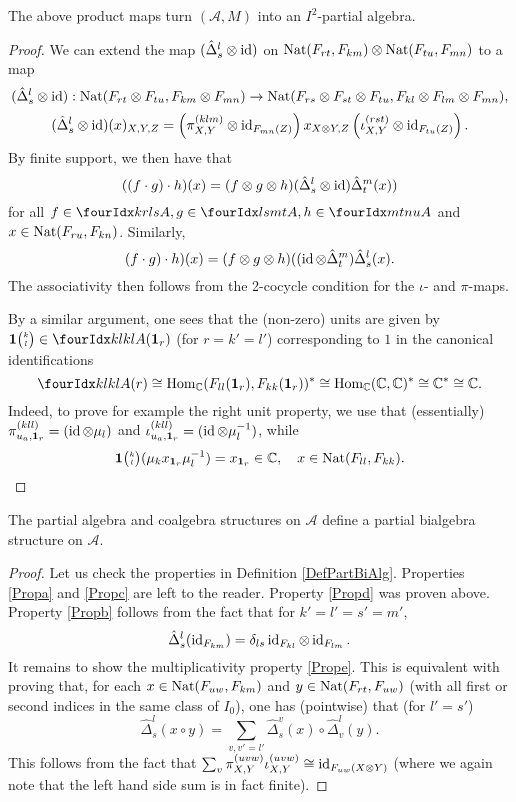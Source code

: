\begin{Lem} The above product maps turn $(\mathscr{A},M)$ into an $I^2$-partial algebra.
\end{Lem}
\begin{proof} We can extend the map $(\hat{\Delta}^l_s\otimes \operatorname{id})$ on $\operatorname{\mathrm{Nat}}(F_{rt},F_{km})\otimes \operatorname{\mathrm{Nat}}(F_{tu},F_{mn})$ to a map \[(\hat{\Delta}^l_s\otimes \operatorname{id}): \operatorname{\mathrm{Nat}}(F_{rt}\otimes F_{tu},F_{km}\otimes F_{mn}) \rightarrow  \operatorname{\mathrm{Nat}}(F_{rs}\otimes F_{st}\otimes F_{tu},F_{kl}\otimes F_{lm}\otimes F_{mn}),\] \[(\hat{\Delta}^l_s\otimes \operatorname{id})(x)_{X,Y,Z} = \left(\pi^{(klm)}_{X,Y}\otimes \operatorname{id}_{F_{mn}(Z)}\right) x_{X\otimes Y, Z} \left(\iota^{(rst)}_{X,Y} \otimes \operatorname{id}_{F_{tu}(Z)}\right).\]
By finite support, we then have that \[((f\cdot g)\cdot h)(x) = (f\otimes g\otimes h)(\hat{\Delta}^l_s\otimes \operatorname{id})\hat{\Delta}^m_t(x))\] for all $f\in \Gr{A}{k}{l}{r}{s},g\in \Gr{A}{l}{m}{s}{t},h\in \Gr{A}{m}{n}{t}{u}$ and $x\in  \operatorname{\mathrm{Nat}}(F_{ru},F_{kn})$. Similarly, \[(f\cdot g)\cdot h)(x) = (f\otimes g\otimes h)((\operatorname{id}\otimes \hat{\Delta}^m_t)\hat{\Delta}^l_s(x).\] The associativity then follows from the 2-cocycle condition for the $\iota$- and $\pi$-maps. 

By a similar argument, one sees that the (non-zero) units are given by $\UnitC{k}{l}\in \Gr{A}{k}{k}{l}{l}(\Unit_{r})$  (for $r=k'=l'$) corresponding to $1$ in the canonical identifications  \[\Gr{A}{k}{k}{l}{l}(r) \cong \Hom_{\C}(\Forget_{ll}(\Unit_{r}),\Forget_{kk}(\Unit_{r}))^*\cong \Hom_{\C}(\C,\C)^*  \cong \C^* \cong \C.\] Indeed, to prove for example the right unit property, we use that (essentially) $\pi_{u_a,\mathbf{1}_{r}}^{(kll)} =(\operatorname{id}\otimes \mu_l)$ and $\iota_{u_a,\mathbf{1}_{r}}^{(kll)} = (\operatorname{id}\otimes \mu_l^{-1})$, while \[\mathbf{1}{\tiny {\begin{pmatrix} k\\l\end{pmatrix}}}(\mu_kx_{\mathbf{1}_{r}}\mu_l^{-1}) = x_{\mathbf{1}_{r}} \in \mathbb{C},\quad x\in \operatorname{\mathrm{Nat}}(F_{ll},F_{kk}).\] %
\end{proof} 

\begin{Prop} The partial algebra and coalgebra structures on $\mathscr{A}$ define a partial bialgebra structure on $\mathscr{A}$. 
\end{Prop}
\begin{proof} Let us check the properties in Definition \ref{DefPartBiAlg}. Properties \ref{Propa} and \ref{Propc} are left to the reader. Property \ref{Propd} was proven above. Property \ref{Propb} follows from the fact that for $k'=l'=s'=m'$, \[\hat{\Delta}^{l}_s(\operatorname{id}_{F_{km}}) = \delta_{ls} \operatorname{id}_{F_{kl}}\otimes \operatorname{id}_{F_{lm}}.\] 
It remains to show the multiplicativity property \ref{Prope}. This is equivalent with proving that, for each $x\in \operatorname{\mathrm{Nat}}(F_{uw},F_{km})$ and $y\in \operatorname{\mathrm{Nat}}(F_{rt},F_{uw})$ (with all first or second indices in the same class of $I_0$), one has (pointwise) that (for $l'=s'$) \[ \hat{\Delta}^l_s(x\circ y) = \sum_{v,v'=l'} \hat{\Delta}^v_s(x)\circ \hat{\Delta}^l_v(y).\] This follows from the fact that $\sum_v \pi^{(uvw)}_{X,Y}\iota^{(uvw)}_{X,Y} \cong \operatorname{id}_{F_{uw}(X\otimes Y)}$ (where we again note that the left hand side sum is in fact finite).
\end{proof} 

